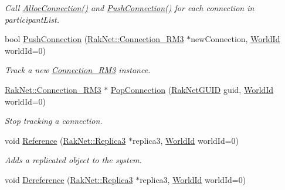 \begin{DoxyCompactItemize}
\begin{DoxyCompactList}\small\item\em Call \hyperlink{class_rak_net_1_1_replica_manager3_ade7df800d3dfd31bdd44de76172eb912}{Alloc\-Connection()} and \hyperlink{class_rak_net_1_1_replica_manager3_a5497b1ce378391cd617cec81ce7d8b94}{Push\-Connection()} for each connection in {\itshape participant\-List}. \end{DoxyCompactList}\item 
bool \hyperlink{class_rak_net_1_1_replica_manager3_a5497b1ce378391cd617cec81ce7d8b94}{Push\-Connection} (\hyperlink{class_rak_net_1_1_connection___r_m3}{Rak\-Net\-::\-Connection\-\_\-\-R\-M3} $\ast$new\-Connection, \hyperlink{group___r_e_p_l_i_c_a___m_a_n_a_g_e_r___g_r_o_u_p3_ga44b59af8e882248f61aa41d8ace38bf7}{World\-Id} world\-Id=0)
\begin{DoxyCompactList}\small\item\em Track a new \hyperlink{class_rak_net_1_1_connection___r_m3}{Connection\-\_\-\-R\-M3} instance. \end{DoxyCompactList}\item 
\hyperlink{class_rak_net_1_1_connection___r_m3}{Rak\-Net\-::\-Connection\-\_\-\-R\-M3} $\ast$ \hyperlink{class_rak_net_1_1_replica_manager3_a8e0a4be1310f582f98462a1831467402}{Pop\-Connection} (\hyperlink{struct_rak_net_1_1_rak_net_g_u_i_d}{Rak\-Net\-G\-U\-I\-D} guid, \hyperlink{group___r_e_p_l_i_c_a___m_a_n_a_g_e_r___g_r_o_u_p3_ga44b59af8e882248f61aa41d8ace38bf7}{World\-Id} world\-Id=0)
\begin{DoxyCompactList}\small\item\em Stop tracking a connection. \end{DoxyCompactList}\item 
void \hyperlink{class_rak_net_1_1_replica_manager3_a9046d827471c0be651b54b7efb7b6f28}{Reference} (\hyperlink{class_rak_net_1_1_replica3}{Rak\-Net\-::\-Replica3} $\ast$replica3, \hyperlink{group___r_e_p_l_i_c_a___m_a_n_a_g_e_r___g_r_o_u_p3_ga44b59af8e882248f61aa41d8ace38bf7}{World\-Id} world\-Id=0)
\begin{DoxyCompactList}\small\item\em Adds a replicated object to the system. \end{DoxyCompactList}\item 
void \hyperlink{class_rak_net_1_1_replica_manager3_a4bd439b6f0479a20236cc29ac36a6ff2}{Dereference} (\hyperlink{class_rak_net_1_1_replica3}{Rak\-Net\-::\-Replica3} $\ast$replica3, \hyperlink{group___r_e_p_l_i_c_a___m_a_n_a_g_e_r___g_r_o_u_p3_ga44b59af8e882248f61aa41d8ace38bf7}{World\-Id} world\-Id=0)

\end{DoxyCompactItemize}
